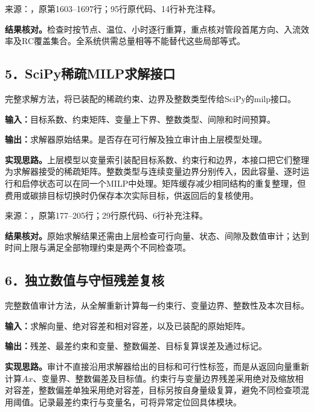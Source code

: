 {\small 来源：，原第1603--1697行；95行原代码、14行补充注释。}\par

\begingroup
{}

\endgroup

\noindent\textbf{结果核对。}检查时按节点、温位、小时逐行重算，重点核对管段首尾方向、入流效率及RC覆盖集合。全系统供需总量相等不能替代这些局部等式。

\subsection*{5．SciPy稀疏MILP求解接口}
完整求解方法，将已装配的稀疏约束、边界及整数类型传给SciPy的milp接口。

\noindent\textbf{输入：}目标系数、约束矩阵、变量上下界、整数类型、间隙和时间预算。\par
\noindent\textbf{输出：}求解器原始结果。是否存在可行解及独立审计由上层模型处理。\par

\noindent\textbf{实现思路。}上层模型以变量索引装配目标系数、约束行和边界，本接口把它们整理为求解器接受的稀疏矩阵。整数类型与连续变量边界分别传入，因此容量、逐时运行和启停状态可以在同一个MILP中处理。矩阵缓存减少相同结构的重复整理，但费用或碳排目标切换时仍保存本次实际目标，供返回后的复核使用。

{\small 来源：，原第177--205行；29行原代码、6行补充注释。}\par

\begingroup
{}

\endgroup

\noindent\textbf{结果核对。}原始求解结果还需由上层检查可行向量、状态、间隙及数值审计；达到时间上限与满足全部物理约束是两个不同检查项。

\subsection*{6．独立数值与守恒残差复核}
完整数值审计方法，从全解重新计算每一约束行、变量边界、整数性及本次目标。

\noindent\textbf{输入：}求解向量、绝对容差和相对容差，以及已装配的原始矩阵。\par
\noindent\textbf{输出：}残差、最差约束和变量、整数偏差、目标复算误差及通过标记。\par

\noindent\textbf{实现思路。}审计不直接沿用求解器给出的目标和可行性标签，而是从返回向量重新计算$Ax$、变量界、整数偏差及目标值。约束行与变量边界残差采用绝对及缩放相对容差，整数偏差单独采用绝对容差，目标另按自身量级复算，避免不同检查项混用阈值。记录最差约束行与变量名，可将异常定位回具体模块。

